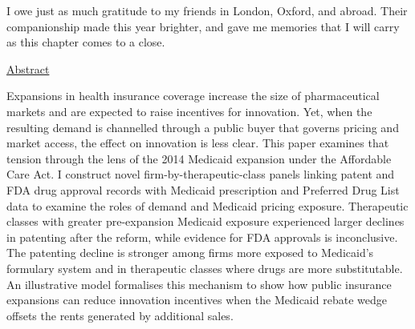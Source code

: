 \documentclass[12pt]{article}
\let\mastertoc\tableofcontents
\renewcommand{\tableofcontents}{}
\begin{document}
\vspace{0.5cm}

\noindent I owe just as much gratitude to my friends in London, Oxford, and abroad. Their companionship made this year brighter, and gave me memories that I will carry as this chapter comes to a close.

\newpage

\thispagestyle{empty}
\vspace*{3cm}
\begin{center}
  {\Large \underline{Abstract}}
\end{center}
\vspace{1cm}

\noindent Expansions in health insurance coverage increase the size of pharmaceutical markets and are expected to raise incentives for innovation. Yet, when the resulting demand is channelled through a public buyer that governs pricing and market access, the effect on innovation is less clear. This paper examines that tension through the lens of the 2014 Medicaid expansion under the Affordable Care Act. I construct novel firm-by-therapeutic-class panels linking patent and FDA drug approval records with Medicaid prescription and Preferred Drug List data to examine the roles of demand and Medicaid pricing exposure. Therapeutic classes with greater pre-expansion Medicaid exposure experienced larger declines in patenting after the reform, while evidence for FDA approvals is inconclusive. The patenting decline is stronger among firms more exposed to Medicaid's formulary system and in therapeutic classes where drugs are more substitutable. An illustrative model formalises this mechanism to show how public insurance expansions can reduce innovation incentives when the Medicaid rebate wedge offsets the rents generated by additional sales.

\newpage

\mastertoc
\newpage








\makeatletter
\renewenvironment{table}[1][tbp]{\@float{table}[#1]}{\end@float}
\makeatother



\end{document}
